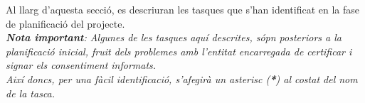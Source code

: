 Al llarg d'aquesta secció, es descriuran les tasques que s'han identificat en la fase de planificació del projecte.\\
\newline \textit{\textbf{Nota important}: Algunes de les tasques aquí descrites, sópn posteriors a la planificació inicial, fruit dels problemes amb l'entitat encarregada de certificar i signar els consentiment informats.\\
Així doncs, per una fàcil identificació, s'afegirà un asterisc (\textbf{*}) al costat del nom de la tasca.}
